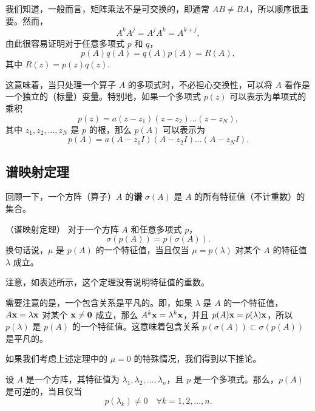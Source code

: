 我们知道，一般而言，矩阵乘法不是可交换的，即通常 $AB \neq BA$，所以顺序很重要。然而，
$$A^k A^j = A^j A^k = A^{k+j},$$
由此很容易证明对于任意多项式 $p$ 和 $q$，
$$p(A)q(A) = q(A)p(A) = R(A),$$
其中 $R(z) = p(z)q(z)$.~

这意味着，当只处理一个算子 $A$ 的多项式时，不必担心交换性，可以将 $A$ 看作是一个独立的（标量）变量。特别地，如果一个多项式 $p(z)$ 可以表示为单项式的乘积
$$p(z) = a(z - z_1)(z - z_2) \dots (z - z_N),$$
其中 $z_1, z_2, \dots, z_N$ 是 $p$ 的根，那么 $p(A)$ 可以表示为
$$p(A) = a(A - z_1 I)(A - z_2 I) \dots (A - z_N I).$$

\subsection{谱映射定理}\label{sec:09-02-02}
回顾一下，一个方阵（算子）$A$ 的\textbf{谱} $\sigma(A)$ 是 $A$ 的所有特征值（不计重数）的集合。

\begin{theorem}\label{stmt:09-02-01} （谱映射定理）
对于一个方阵 $A$ 和任意多项式 $p$，
$$\sigma(p(A)) = p(\sigma(A)).$$
换句话说，$\mu$ 是 $p(A)$ 的一个特征值，当且仅当 $\mu = p(\lambda)$ 对某个 $A$ 的特征值 $\lambda$ 成立。\end{theorem}

注意，如表述所示，这个定理没有说明特征值的重数。

\begin{remark*}
需要注意的是，一个包含关系是平凡的。即，如果 $\lambda$ 是 $A$ 的一个特征值，$A\mathbf{x} = \lambda \mathbf{x}$ 对某个 $\mathbf{x} \neq \mathbf{0}$ 成立，那么 $A^k \mathbf{x} = \lambda^k \mathbf{x}$，并且 $p(A)\mathbf{x} = p(\lambda)\mathbf{x}$，所以 $p(\lambda)$ 是 $p(A)$ 的一个特征值。这意味着包含关系 $p(\sigma(A)) \subset \sigma(p(A))$ 是平凡的。
\end{remark*}


如果我们考虑上述定理中的 $\mu=0$ 的特殊情况，我们得到以下推论。

\begin{corollary}\label{stmt:09-02-02}
设 $A$ 是一个方阵，其特征值为 $\lambda_1, \lambda_2, \dots, \lambda_n$，且 $p$ 是一个多项式。那么，$p(A)$ 是可逆的，当且仅当 $$p(\lambda_k) \neq 0\quad \forall k = 1, 2, \dots, n.$$
\end{corollary}

